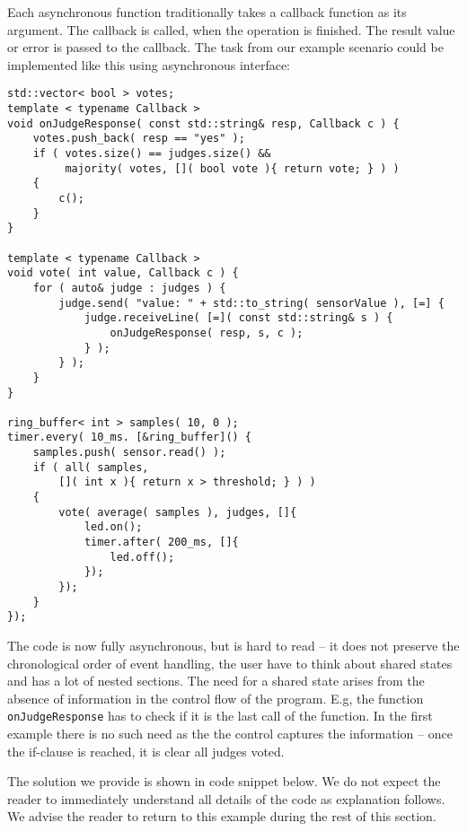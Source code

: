 Each asynchronous function traditionally takes a callback function as its
argument. The callback is called, when the operation is finished. The result
value or error is passed to the callback. The task from our example scenario
could be implemented like this using asynchronous interface:

\begin{verbatim}
std::vector< bool > votes;
template < typename Callback >
void onJudgeResponse( const std::string& resp, Callback c ) {
    votes.push_back( resp == "yes" );
    if ( votes.size() == judges.size() &&
         majority( votes, []( bool vote ){ return vote; } ) )
    {
        c();
    }
}

template < typename Callback >
void vote( int value, Callback c ) {
    for ( auto& judge : judges ) {
        judge.send( "value: " + std::to_string( sensorValue ), [=] {
            judge.receiveLine( [=]( const std::string& s ) {
                onJudgeResponse( resp, s, c );
            } );
        } );
    }
}

ring_buffer< int > samples( 10, 0 );
timer.every( 10_ms. [&ring_buffer]() {
    samples.push( sensor.read() );
    if ( all( samples,
        []( int x ){ return x > threshold; } ) )
    {
        vote( average( samples ), judges, []{
            led.on();
            timer.after( 200_ms, []{
                led.off();
            });
        });
    }
});
\end{verbatim}

The code is now fully asynchronous, but is hard to read -- it does not preserve
the chronological order of event handling, the user have to think about shared
states and has a lot of nested sections. The need for a shared state arises from
the absence of information in the control flow of the program. E.g, the function
\texttt{onJudgeResponse} has to check if it is the last call of the function. In
the first example there is no such need as the the control captures the
information -- once the if-clause is reached, it is clear all judges voted.

The solution we provide is shown in code snippet below. We do not expect the
reader to immediately understand all details of the code as explanation
follows. We advise the reader to return to this example during the rest of
this section.

